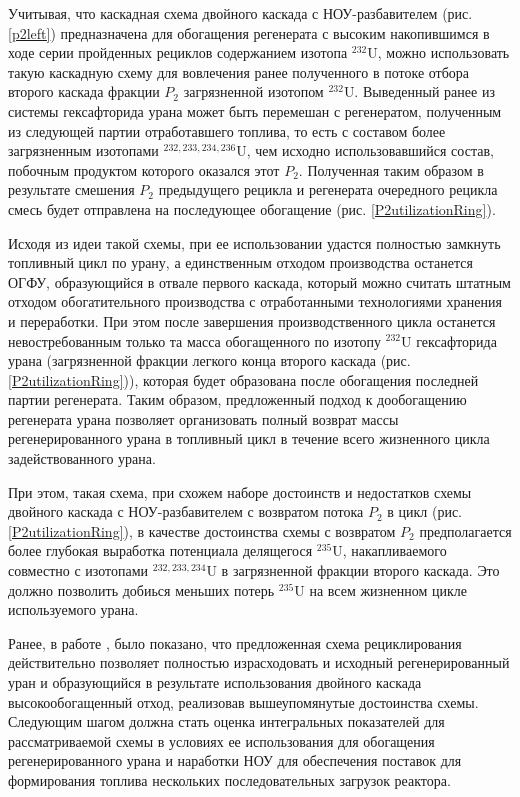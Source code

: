 Учитывая, что каскадная схема двойного каскада с НОУ-разбавителем (рис. \ref{p2left}) предназначена для обогащения регенерата с высоким накопившимся в ходе серии пройденных рециклов содержанием изотопа $^{232}$U, можно использовать такую каскадную схему для вовлечения ранее полученного в потоке отбора второго каскада фракции $P_2$ загрязненной изотопом $^{232}$U. Выведенный ранее из системы гексафторида урана может быть перемешан с регенератом, полученным из следующей партии отработавшего топлива, то есть с составом более загрязненным изотопами $^{232,233,234,236}$U, чем исходно использовавшийся состав, побочным продуктом которого оказался этот $P_2$. Полученная таким образом в результате смешения $P_2$ предыдущего рецикла и регенерата очередного рецикла смесь будет отправлена на последующее обогащение (рис. \ref{P2utilizationRing}).

Исходя из идеи такой схемы, при ее использовании удастся полностью замкнуть топливный цикл по урану, а единственным отходом производства останется ОГФУ, образующийся в отвале первого каскада, который можно считать штатным отходом обогатительного производства с отработанными технологиями хранения и переработки. При этом после завершения производственного цикла останется невостребованным только та масса обогащенного по изотопу $^{232}$U гексафторида урана (загрязненной фракции легкого конца второго каскада (рис. \ref{P2utilizationRing})), которая будет образована после обогащения последней партии регенерата. Таким образом, предложенный подход к дообогащению регенерата урана позволяет организовать полный возврат массы регенерированного урана в топливный цикл в течение всего жизненного цикла задействованного урана.

При этом, такая схема, при схожем наборе достоинств и недостатков схемы двойного каскада с НОУ-разбавителем с возвратом потока $P_2$ в цикл (рис. \ref{P2utilizationRing}), в качестве достоинства схемы с возвратом $P_2$ предполагается более глубокая выработка потенциала делящегося $^{235}$U, накапливаемого совместно с изотопами $^{232,233,234}$U в загрязненной фракции второго каскада. Это должно позволить добиься меньших потерь $^{235}$U на всем жизненном цикле используемого урана.


Ранее, в работе \cite{nevinicaToplivnyyCiklLegkovodnogo2019}, было показано, что предложенная схема рециклирования действительно позволяет полностью израсходовать и исходный регенерированный уран и образующийся в результате использования двойного каскада высокообогащенный отход, реализовав вышеупомянутые достоинства схемы. Следующим шагом должна стать оценка интегральных показателей для рассматриваемой схемы в условиях ее использования для обогащения регенерированного урана и наработки НОУ для обеспечения поставок для формирования топлива нескольких последовательных загрузок реактора.

